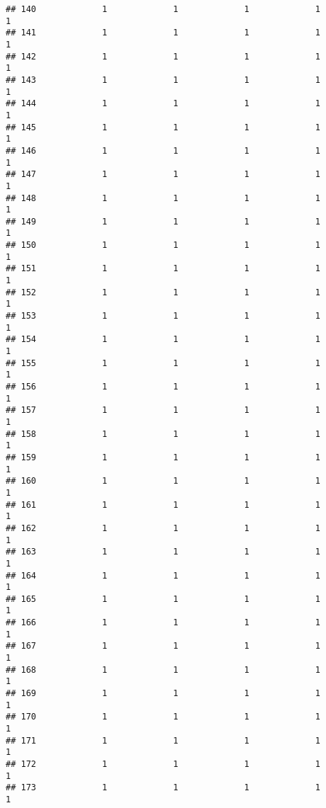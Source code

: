 \documentclass[
]{article}
\begin{document}
\begin{verbatim}
## 140             1             1             1             1             1
## 141             1             1             1             1             1
## 142             1             1             1             1             1
## 143             1             1             1             1             1
## 144             1             1             1             1             1
## 145             1             1             1             1             1
## 146             1             1             1             1             1
## 147             1             1             1             1             1
## 148             1             1             1             1             1
## 149             1             1             1             1             1
## 150             1             1             1             1             1
## 151             1             1             1             1             1
## 152             1             1             1             1             1
## 153             1             1             1             1             1
## 154             1             1             1             1             1
## 155             1             1             1             1             1
## 156             1             1             1             1             1
## 157             1             1             1             1             1
## 158             1             1             1             1             1
## 159             1             1             1             1             1
## 160             1             1             1             1             1
## 161             1             1             1             1             1
## 162             1             1             1             1             1
## 163             1             1             1             1             1
## 164             1             1             1             1             1
## 165             1             1             1             1             1
## 166             1             1             1             1             1
## 167             1             1             1             1             1
## 168             1             1             1             1             1
## 169             1             1             1             1             1
## 170             1             1             1             1             1
## 171             1             1             1             1             1
## 172             1             1             1             1             1
## 173             1             1             1             1             1

\end{verbatim}
\end{document}
